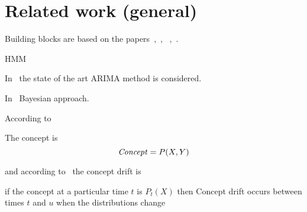 \section{Related work (general)}
Building blocks are based on the papers~\cite{mackay2007},~\cite{Chapados2014},~\cite{Rasmussen2010} ,~\cite{MacKay_Inference_Book}.

HMM~\cite{HMMtutor}

In~\cite{Box_Jenkins_Arima} the state of the art ARIMA method is considered.

In~\cite{mackay2007} Bayesian approach.


According to~\cite{GamaAsurveyOnConceptDrift} 
\begin{definition}
   The concept is
   \begin{equation}
   \text{\textit{Concept}} = P(X,Y)
   \end{equation}    
\end{definition}
and according to~\cite{WebbConceptDrift} the concept drift is
\begin{definition}
   if the concept at a particular time $t$ is $P_t(X)$ then Concept drift occurs between times $t$ and $u$ when the distributions change
   \label{def:concept_drift}    
\end{definition}

